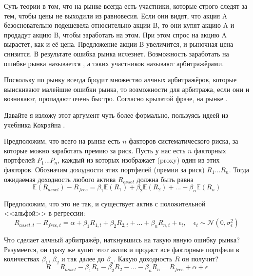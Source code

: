 Суть теории в том, что на рынке всегда есть участники, которые строго следят за тем, чтобы цены не выходили из равновесия. Если они видят, что акция A безосновательно подешевела относительно акции B, то они купят акцию A и продадут акцию B, чтобы заработать на этом. При этом спрос на акцию A вырастет, как и её цена. Предложение акции B увеличится, и рыночная цена снизится. В результате ошибка рынка исчезнет. Возможность заработать на ошибке рынка называется , а таких участников называют арбитражёрами.

Поскольку по рынку всегда бродит множество алчных арбитражёров, которые выискивают малейшие ошибки рынка, то возможности для арбитража, если они и возникают, пропадают очень быстро. Согласно крылатой фразе, на рынке .

Давайте я изложу этот аргумент чуть более формально, пользуясь идеей из учебника Кохрэйна \cite[p.~180]{cochrane2005asset}.

Предположим, что всего на рынке есть $n$ факторов систематического риска, за которые можно заработать премию за риск. Пусть у нас есть $n$ факторных портфелей $P_1...P_n$, каждый из которых изображает (proxy) один из этих факторов. Обозначим доходности этих портфелей (премии за риск) $R_1...R_n$. Тогда ожидаемая доходность любого актива $R_{asset}$ должна быть равна
\begin{equation}
\mathbb{E}(R_{asset}) - R_{free} = \beta_1\mathbb{E}(R_1) + \beta_2\mathbb{E}(R_2) + ... + \beta_n\mathbb{E}(R_n)
\label{apt_equation}
\end{equation}

Предположим, что это не так, и существует актив с положительной <<альфой>> в регрессии:\begin{equation}
R_{asset,t} - R_{free,t} = \alpha + \beta_1R_{1,t} + \beta_2R_{2,t} + ... + \beta_nR_{n,t} + \epsilon_t, \quad \epsilon_t \sim \mathcal{N}(0, \sigma_{\epsilon}^2)
\label{apt_regression_example}
\end{equation}

Что сделает алчный арбитражёр, наткнувшись на такую явную ошибку рынка? Разумеется, он сразу же купит этот актив и продаст все факторные портфели в количествах $\beta_1$, $\beta_2$ и так далее до $\beta_n$. Какую доходность $R$ он получит?
\begin{equation*}
R = R_{asset} - \beta_1R_{1} - \beta_2R_{2} - ... - \beta_nR_{n} = R_{free} + \alpha + \epsilon
\end{equation*}

